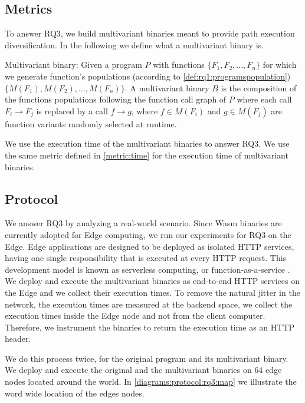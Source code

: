 \subsection*{Metrics}

To answer RQ3, we build multivariant \wasm binaries meant to provide path execution diversification. In the following we define what a multivariant binary is. 

\begin{definition}{Multivariant binary:}
    \label{def:multivariant_binary}
    \normalfont
    Given a program $P$ with functions $\{F_1, F_2, ..., F_n\}$ for which we generate function's populations (according to \autoref{def:rq1:programspopulation}) $\{M(F_1), M(F_2), ..., M(F_n)\}$. A multivariant binary $B$ is the composition of the functions populations following the function call graph of $P$ where each call $F_i \rightarrow F_j$ is replaced by a call $f \rightarrow g $, where $f\in M(F_i)$ and $g \in M(F_j)$ are function variants randomly selected at runtime. 

\end{definition}

We use the execution time of the multivariant binaries to answer RQ3. We use the same metric defined in \autoref{metric:time} for the execution time of multivariant binaries.

\subsection*{Protocol}

We answer RQ3 by analyzing a real-world scenario. Since Wasm binaries are currently adopted for Edge computing,
we run our experiments for RQ3 on the Edge. 
Edge applications are designed to be deployed as isolated HTTP services, having one single responsibility that is executed at every HTTP request. This development model is known as serverless computing, or function-as-a-service \cite{shillaker2020faasm,Narayan2021Swivel}. 
We deploy and execute the multivariant binaries as end-to-end HTTP services on the Edge and we collect their execution times.
To remove the natural jitter in the network, the execution times are measured at the backend space, \ie we collect the execution times inside the Edge node and not from the client computer. 
Therefore, we instrument the binaries to return the execution time as an HTTP header. 

We do this process twice, for the original program and its multivariant binary. We deploy and execute the original and the multivariant binaries on 64 edge nodes located around the world. In \autoref{diagrams:protocol:rq3:map} we illustrate the word wide location of the edges nodes.


